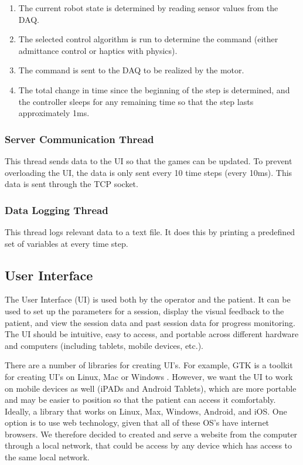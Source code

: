 \documentclass[12pt]{report}
\begin{document}
	\begin{enumerate}
		\item The current robot state is determined by reading sensor values from the DAQ.
		\item The selected control algorithm is run to determine the command (either admittance control or haptics with physics). 
		\item The command is sent to the DAQ to be realized by the motor. 
		\item The total change in time since the beginning of the step is determined, and the controller sleeps for any remaining time so that the step lasts approximately 1ms. 
	\end{enumerate}
	
	\subsubsection{Server Communication Thread}
	
	This thread sends data to the UI so that the games can be updated. To prevent overloading the UI, the data is only sent every 10 time steps (every 10ms). This data is sent through the TCP socket. 	
	
	\subsubsection{Data Logging Thread}
	This thread logs relevant data to a text file. It does this by printing a predefined set of variables at every time step. 
	
	\subsection{User Interface} 
	
	The User Interface (UI) is used both by the operator and the patient. It can be used to set up the parameters for a session, display the visual feedback to the patient, and  view the session data and past session data for progress monitoring. The UI should be intuitive, easy to access, and portable across different hardware and computers (including tablets, mobile devices, etc.).
	
	There are a number of libraries for creating UI's. For example, GTK is a toolkit for creating UI's on Linux, Mac or Windows \cite{TheGTKTeam2019}. However, we want the UI to work on mobile devices as well (iPADs and Android Tablets), which are more portable and may be easier to position so that the patient can access it comfortably. Ideally, a library that works on Linux, Max, Windows, Android, and iOS. One option is to use web technology, given that all of these OS's have internet browsers. We therefore decided to created and serve a website from the computer through a local network, that could be access by any device which has access to the same local network. 
	
\end{document}
